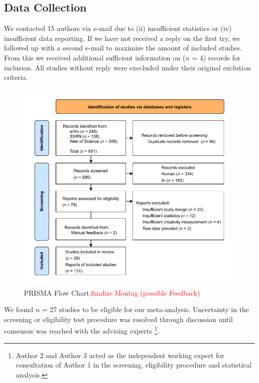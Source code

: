\documentclass[manuscript, screen, review, acmsmall, anonymous]{acmart}
\newcommand{\TODO}[1]{\textcolor{red}{#1}}
\begin{document}
\subsection{Data Collection}

We contacted 15 authors via e-mail due to (ii) insufficient statistics or (iv) insufficient data reporting. If we have not received a reply on the first try, we followed up with a second e-mail to maximize the amount of included studies. From this we received additional sufficient information on ($n$ = 4) records for inclusion. All studies without reply were execluded under their original exclution criteria.


\begin{figure}[H]
  \centering
  \includegraphics[width=\linewidth]{PRISMA_Flowchart}
  \caption{PRISMA Flow Chart.\TODO{finalize Montag (possible Feedback)}}
  \label{fig:PRIMSAFlowchart}
\end{figure}
We found $n$ = 27 studies to be eligible for our meta-analysis. Uncertainty in the screening or eligibility test procedure was resolved through discussion until consensus was reached with the advising experts \footnote{Author 2 and Author 3 acted as the independent working expert for consultation of Author 1 in the screening, eligibility procedure and statistical analysis.}.
\end{document}
